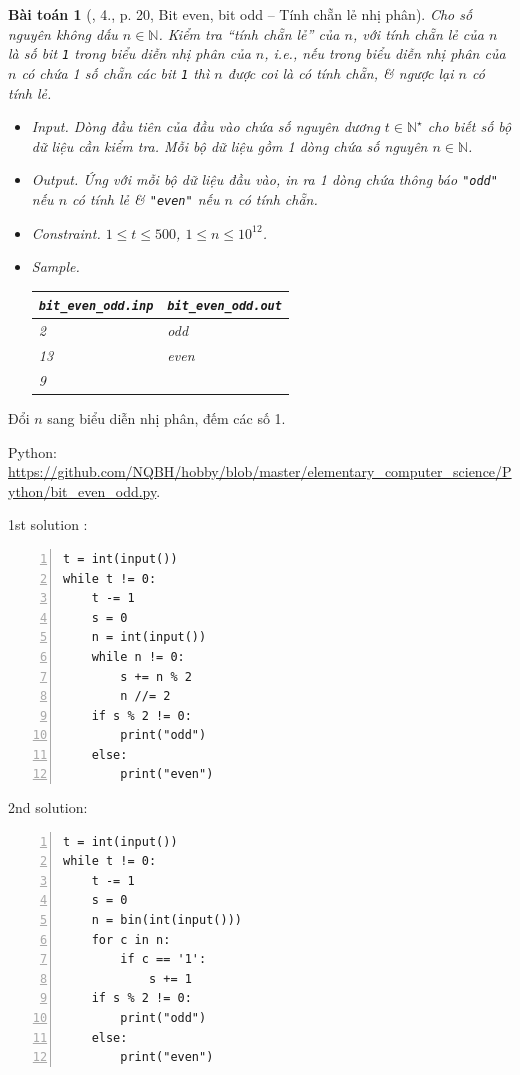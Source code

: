 \documentclass{article}
\newtheorem{baitoan}{Bài toán}
\begin{document}
\begin{baitoan}[\cite{Duc_200_BT_Python}, 4., p. 20, Bit even, bit odd -- Tính chẵn lẻ nhị phân]
	Cho số nguyên không dấu $n\in\mathbb{N}$. Kiểm tra ``tính chẵn lẻ'' của $n$, với \emph{tính chẵn lẻ} của $n$ là số bit {\tt1} trong biểu diễn nhị phân của $n$, i.e., nếu trong biểu diễn nhị phân của $n$ có chứa 1 số chẵn các bit {\tt1} thì $n$ được coi là có tính chẵn, \& ngược lại $n$ có tính lẻ.
	\begin{itemize}
		\item {\sf Input.} Dòng đầu tiên của đầu vào chứa số nguyên dương $t\in\mathbb{N}^\star$ cho biết số bộ dữ liệu cần kiểm tra. Mỗi bộ dữ liệu gồm 1 dòng chứa số nguyên $n\in\mathbb{N}$.
		\item {\sf Output.} Ứng với mỗi bộ dữ liệu đầu vào, in ra 1 dòng chứa thông báo {\tt"odd"} nếu $n$ có tính lẻ \& {\tt"even"} nếu $n$ có tính chẵn.
		\item {\sf Constraint.} $1\le t\le500$, $1\le n\le10^{12}$.
		\item {\sf Sample.}
		\begin{table}[H]
			\centering
			\begin{tabular}{|l|l|}
				\hline
				\verb|bit_even_odd.inp| & \verb|bit_even_odd.out| \\
				\hline
				2 & odd \\
				13 & even \\
				9 & \\
				\hline
			\end{tabular}
		\end{table}
	\end{itemize}
\end{baitoan}
Đổi $n$ sang biểu diễn nhị phân, đếm các số 1.

\noindent Python: \url{https://github.com/NQBH/hobby/blob/master/elementary_computer_science/Python/bit_even_odd.py}.
\begin{multicols}{2}
	1st solution \cite[4., p. 204]{Duc_200_BT_Python}:
\begin{Verbatim}[numbers=left,xleftmargin=5mm]
t = int(input())
while t != 0:
    t -= 1
    s = 0
    n = int(input())
    while n != 0:
        s += n % 2
        n //= 2
    if s % 2 != 0:
        print("odd")
    else:
        print("even")
\end{Verbatim}
\columnbreak
2nd solution:
\begin{Verbatim}[numbers=left,xleftmargin=5mm]
t = int(input())
while t != 0:
    t -= 1
    s = 0
    n = bin(int(input()))
    for c in n:
        if c == '1':
            s += 1
    if s % 2 != 0:
        print("odd")
    else:
        print("even")
\end{Verbatim}
\end{multicols}
\end{document}
